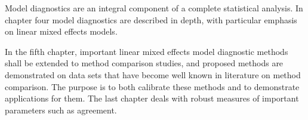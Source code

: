 \documentclass[12pt, a4paper]{report}
\theoremstyle{plain}
\theoremstyle{definition}
\theoremstyle{remark}
\begin{document}
	Model diagnostics are an integral component of a complete statistical analysis.
	In chapter four model diagnostics are described in depth, with particular
	emphasis on linear mixed effects models.
	
	In the fifth chapter, important linear mixed effects model diagnostic methods shall be extended to method comparison studies, and proposed methods are demonstrated on data sets that have become well known in literature on method comparison. The purpose is to both calibrate these methods and to demonstrate applications for them.
	The last chapter deals with robust measures of important parameters such as agreement.
	
	
	
\end{document}
